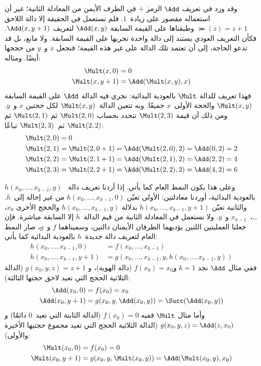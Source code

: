 \documentclass[../../../include/open-logic-section]{subfiles}
\begin{document}
وقد ورد في تعريف $\Add$ الرمز $+$ في الطرف الأيمن من المعادلة
الثانية؛ غير أن استعماله مقصور على زيادة~$1$. فلم نستعمل في الحقيقة إلا دالة اللاحق
$\Succ(z)=z+1$ وطبقناها على القيمة السابقة $\Add(x,y)$ لتعريف
$\Add(x,y+1)$. فكأن التعريف العودي يستند إلى
دالة واحدة نجريها على القيمة السابقة. ولا مانع، بل قد تدعو
الحاجة، إلى أن تعتمد تلك الدالة على غير هذه القيمة؛ فنجعل
$x$ و~$y$ من حججها أيضًا. ومثاله:
\begin{align*}
  \Mult(x,0) & =  0 \\
  \Mult(x,y+1) & =  \Add(\Mult(x,y),x)
\end{align*}
فهذا تعريف للدالة $\Mult$ بالعودية البدائية: نجري فيه الدالة $\Add$ على
القيمة السابقة $\Mult(x,y)$ والحجة الأولى~$x$ جميعًا. وبه
تتعين الدالة~$\Mult(x,y)$ لكل حجتين $x$ و~$y$. ومن ذلك أن قيمة
 $\Mult(2,3)$ تتحدد بحساب $\Mult(2,0)$ ثم $\Mult(2,1)$ ثم $\Mult(2,2)$
ثم~$\Mult(2,3)$ تباعًا:
\begin{align*}
  \Mult(2,0) & = 0\\
  \Mult(2,1) & = \Mult(2,0+1) =
  \Add(\Mult(2,0), 2) = \Add(0, 2) = 2\\
  \Mult(2,2) & = \Mult(2,1+1) =
  \Add(\Mult(2,1), 2) = \Add(2, 2) = 4\\
  \Mult(2,3) & = \Mult(2,2+1) =
  \Add(\Mult(2,2), 2) = \Add(4, 2) = 6
\end{align*}

وعلى هذا يكون النمط العام كما يأتي. إذا أردنا تعريف دالة
~$h(x_0,\dots,x_{k-1},y)$ بالعودية البدائية، أوردنا معادلتين: الأولى تعيّن
$h(x_0,\dots,x_{k-1},0)$ من غير إحالة إلى~$h$. والثانية تعيّن
$h(x_0,\dots,x_{k-1},y+1)$ بدلالة $h(x_0,\dots,x_{k-1},y)$ والحجج
الأخرى $x_0$، …،~$x_{k-1}$ و~$y$. ولا نستعمل في المعادلة الثانية من قيم
الدالة~$h$ إلا السابقة مباشرة. فإن جعلنا العمليتين اللتين يؤديهما
الطرفان الأيمنان دالتين، وسميناهما $f$ و~$g$، صار النمط العام
لتعريف دالة جديدة~$h$ بالعودية البدائية كما يأتي:
\begin{align*}
  h(x_0, \dots, x_{k-1}, 0) & = f(x_0, \dots, x_{k-1})\\
  h(x_0, \dots, x_{k-1}, y+1) & =
  g(x_0, \dots, x_{k-1}, y, h(x_0, \dots, x_{k-1}, y))
\end{align*}
ففي مثال $\Add$ نجد $k=1$ و$f(x_0)=x_0$ (دالة الهوية)، و
$g(x_0,y,z)=z+1$ (الدالة الثلاثية الحجج التي تعيد لاحق حجتها الثالثة):
\begin{align*}
  \Add(x_0, 0) & = f(x_0) = x_0\\
  \Add(x_0, y+1) & = g(x_0, y, \Add(x_0, y)) =
  \Succ(\Add(x_0, y))
\end{align*}
وأما مثال $\Mult$ ففيه $f(x_0)=0$ (الدالة الثابتة التي تعيد~$0$
دائمًا) و$g(x_0,y,z)=\Add(z,x_0)$ (الدالة الثلاثية الحجج التي تعيد
مجموع حجتيها الأخيرة والأولى):
\begin{align*}
  \Mult(x_0,0) & =  f(x_0) = 0 \\
  \Mult(x_0,y+1) & =  g(x_0, y, \Mult(x_0,y)) =
  \Add(\Mult(x_0,y), x_0)
\end{align*}
\end{document}
